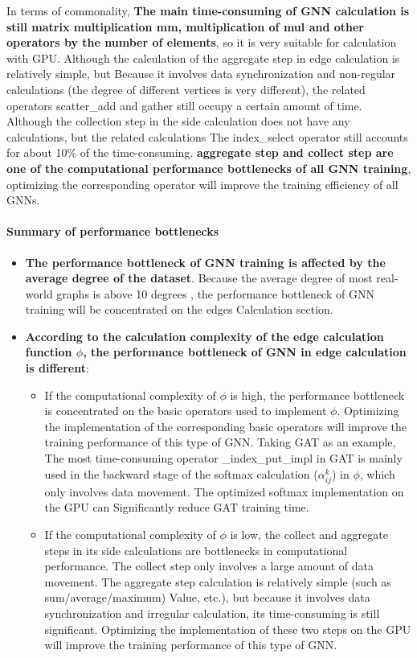In terms of commonality, 
\textbf{The main time-consuming of GNN calculation is still matrix multiplication mm, multiplication of mul and other operators by the number of elements},
so it is very suitable for calculation with GPU. Although the calculation of the aggregate step in edge calculation is relatively simple,
but Because it involves data synchronization and non-regular calculations (the degree of different vertices is very different),
the related operators scatter\_add and gather still occupy a certain amount of time.
Although the collection step in the side calculation does not have any calculations,
but the related calculations The index\_select operator still accounts for about 10\% of the time-consuming.
\textbf{aggregate step and collect step are one of the computational performance bottlenecks of all GNN training},
optimizing the corresponding operator will improve the training efficiency of all GNNs.

\paragraph{Summary of performance bottlenecks}

\begin{itemize}
    \item \textbf{The performance bottleneck of GNN training is affected by the average degree of the dataset}. 
    Because the average degree of most real-world graphs is above 10 degrees \cite{network-repository}, 
    the performance bottleneck of GNN training will be concentrated on the edges Calculation section.
    \item \textbf{According to the calculation complexity of the edge calculation function $\phi$, the performance bottleneck of GNN in edge calculation is different}:
    \begin{itemize}
        \item If the computational complexity of $\phi$ is high, the performance bottleneck is concentrated on the basic operators used to implement $\phi$.
        Optimizing the implementation of the corresponding basic operators will improve the training performance of this type of GNN.
        Taking GAT as an example, The most time-consuming operator \_index\_put\_impl in GAT is mainly used in the backward stage of the softmax calculation ($\alpha^k_{ij}$) in $\phi$,
        which only involves data movement.
        The optimized softmax implementation on the GPU can Significantly reduce GAT training time.
        \item If the computational complexity of $\phi$ is low, the collect and aggregate steps in its side calculations are bottlenecks in computational performance. The collect step only involves a large amount of data movement. The aggregate step calculation is relatively simple (such as sum/average/maximum) Value, etc.), but because it involves data synchronization and irregular calculation, its time-consuming is still significant.
         Optimizing the implementation of these two steps on the GPU will improve the training performance of this type of GNN.
    \end{itemize}
\end{itemize}


